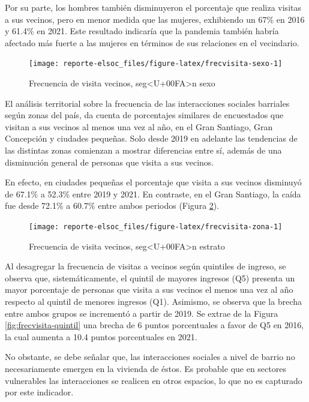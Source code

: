 \documentclass[
  12pt,
]{book}
\begin{document}
Por su parte, los hombres también disminuyeron el porcentaje que realiza visitas a sus vecinos, pero en menor medida que las mujeres, exhibiendo un 67\% en 2016 y 61.4\% en 2021. Este resultado indicaría que la pandemia también habría afectado más fuerte a las mujeres en términos de sus relaciones en el vecindario.

\begin{figure}

{\centering \texttt{[image: reporte-elsoc\_files/figure-latex/frecvisita-sexo-1]} 

}

\caption{Frecuencia de visita vecinos, seg<U+00FA>n sexo}\label{fig:frecvisita-sexo}
\end{figure}

El análisis territorial sobre la frecuencia de las interacciones sociales barriales según zonas del país, da cuenta de porcentajes similares de encuestados que visitan a sus vecinos al menos una vez al año, en el Gran Santiago, Gran Concepción y ciudades pequeñas. Solo desde 2019 en adelante las tendencias de las distintas zonas comienzan a mostrar diferencias entre sí, además de una disminución general de personas que visita a sus vecinos.

En efecto, en ciudades pequeñas el porcentaje que visita a sus vecinos disminuyó de 67.1\% a 52.3\% entre 2019 y 2021. En contraste, en el Gran Santiago, la caída fue desde 72.1\% a 60.7\% entre ambos periodos (Figura \ref{fig:frecvisita-zona}).

\begin{figure}

{\centering \texttt{[image: reporte-elsoc\_files/figure-latex/frecvisita-zona-1]} 

}

\caption{Frecuencia de visita vecinos, seg<U+00FA>n estrato}\label{fig:frecvisita-zona}
\end{figure}

Al desagregar la frecuencia de visitas a vecinos según quintiles de ingreso, se observa que, sistemáticamente, el quintil de mayores ingresos (Q5) presenta un mayor porcentaje de personas que visita a sus vecinos el menos una vez al año respecto al quintil de menores ingresos (Q1). Asimismo, se observa que la brecha entre ambos grupos se incrementó a partir de 2019. Se extrae de la Figura \ref{fig:frecvisita-quintil} una brecha de 6 puntos porcentuales a favor de Q5 en 2016, la cual aumenta a 10.4 puntos porcentuales en 2021.

No obstante, se debe señalar que, las interacciones sociales a nivel de barrio no necesariamente emergen en la vivienda de éstos. Es probable que en sectores vulnerables las interacciones se realicen en otros espacios, lo que no es capturado por este indicador.
\end{document}
